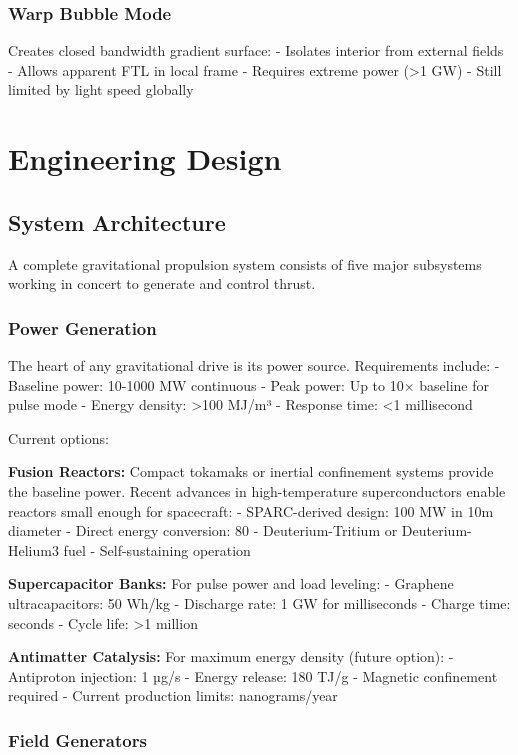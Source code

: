 \documentclass[12pt,letterpaper]{book}
\theoremstyle{definition}
\theoremstyle{plain}
\theoremstyle{remark}
\begin{document}
{{{{{\subsection{Warp Bubble Mode}

Creates closed bandwidth gradient surface:
- Isolates interior from external fields
- Allows apparent FTL in local frame
- Requires extreme power (>1 GW)
- Still limited by light speed globally

\chapter{Engineering Design}

\section{System Architecture}

A complete gravitational propulsion system consists of five major subsystems working in concert to generate and control thrust.

\subsection{Power Generation}

The heart of any gravitational drive is its power source. Requirements include:
- Baseline power: 10-1000 MW continuous
- Peak power: Up to 10× baseline for pulse mode
- Energy density: >100 MJ/m³
- Response time: <1 millisecond

Current options:

\textbf{Fusion Reactors:}
Compact tokamaks or inertial confinement systems provide the baseline power. Recent advances in high-temperature superconductors enable reactors small enough for spacecraft:
- SPARC-derived design: 100 MW in 10m diameter
- Direct energy conversion: 80%
- Deuterium-Tritium or Deuterium-Helium3 fuel
- Self-sustaining operation

\textbf{Supercapacitor Banks:}
For pulse power and load leveling:
- Graphene ultracapacitors: 50 Wh/kg
- Discharge rate: 1 GW for milliseconds
- Charge time: seconds
- Cycle life: >1 million

\textbf{Antimatter Catalysis:}
For maximum energy density (future option):
- Antiproton injection: 1 µg/s
- Energy release: 180 TJ/g
- Magnetic confinement required
- Current production limits: nanograms/year

\subsection{Field Generators}

}}}}}
\end{document}
